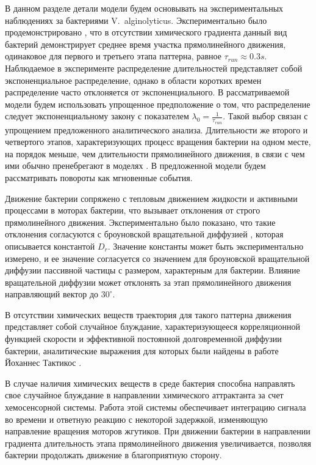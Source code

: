 В данном разделе детали модели будем основывать на экспериментальных наблюдениях за бактериями V.~alginolyticus. Экспериментально было продемонстрировано \cite{altindal_implications_2011}, что в отсутствии химического градиента данный вид бактерий демонстрирует среднее время участка прямолинейного движения, одинаковое для первого и третьего этапа паттерна, равное $\tau_{run} \approx 0.3s$. Наблюдаемое в эксперименте распределение длительностей представляет собой экспоненциальное распределение, однако в области коротких времен распределение часто отклоняется от экспоненциального. В рассматриваемой модели будем использовать упрощенное предположение о том, что распределение следует экспоненциальному закону с показателем $\lambda_0=\frac{1}{\tau_{run}}$. Такой выбор связан с упрощением предложенного аналитического анализа. Длительности же второго и четвертого этапов, характеризующих процесс вращения бактерии на одном месте, на порядок меньше, чем длительности прямолинейного движения, в связи с чем ими обычно пренебрегают в моделях \cite{block_adaptation_1983}. В предложенной модели будем рассматривать повороты как мгновенные события.

Движение бактерии сопряжено с тепловым движением жидкости и активными процессами в моторах бактерии, что вызывает отклонения от строго прямолинейного движения. Экспериментально было показано, что такие отклонения согласуются с броуновской вращательной диффузией \cite{berg_chemotaxis_1972}, которая описывается константой $D_r$. Значение константы может быть экспериментально измерено, и ее значение согласуется со значением для броуновской вращательной диффузии пассивной частицы с размером, характерным для бактерии. Влияние вращательной диффузии может отклонять за этап прямолинейного движения направляющий вектор до $30^\circ$. 

В отсутствии химических веществ траектория для такого паттерна движения представляет собой случайное блуждание, характеризующееся корреляционной функцией скорости и эффективной постоянной долговременной диффузии бактерии, аналитические выражения для которых были найдены в работе Йоханнес Тактикос \cite{taktikos_how_2013}. 

В случае наличия химических веществ в среде бактерия способна направлять свое случайное блуждание в направлении химического аттрактанта за счет хемосенсорной системы. Работа этой системы обеспечивает интеграцию сигнала во времени и ответную реакцию с некоторой задержкой, изменяющую направление вращения моторов жгутиков. При движении бактерии в направлении градиента длительность этапа прямолинейного движения увеличивается, позволяя бактерии продолжать движение в благоприятную сторону. 

